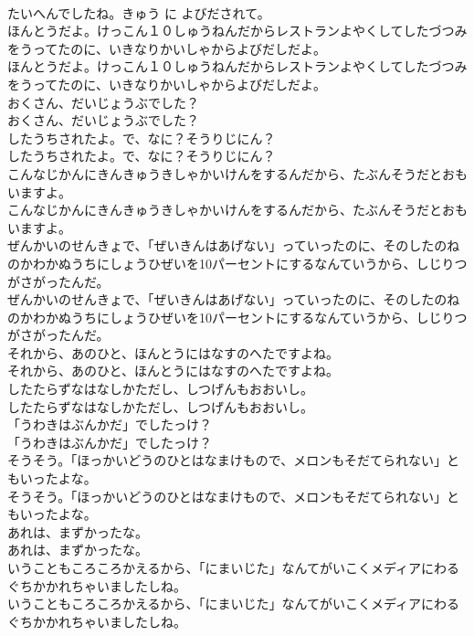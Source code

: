 \documentclass[8pt]{extreport}
\begin{document}
\begin{CJK}{UTF8}{min}
\\	たいへんでしたね。きゅう に よびだされて。
\\	ほんとうだよ。けっこん１０しゅうねんだからレストランよやくしてしたづつみをうってたのに、いきなりかいしゃからよびだしだよ。
\\	ほんとうだよ。けっこん１０しゅうねんだからレストランよやくしてしたづつみをうってたのに、いきなりかいしゃからよびだしだよ。
\\	おくさん、だいじょうぶでした？
\\	おくさん、だいじょうぶでした？
\\	したうちされたよ。で、なに？そうりじにん？
\\	したうちされたよ。で、なに？そうりじにん？
\\	こんなじかんにきんきゅうきしゃかいけんをするんだから、たぶんそうだとおもいますよ。
\\	こんなじかんにきんきゅうきしゃかいけんをするんだから、たぶんそうだとおもいますよ。
\\	ぜんかいのせんきょで、「ぜいきんはあげない」っていったのに、そのしたのねのかわかぬうちにしょうひぜいを10パーセントにするなんていうから、しじりつがさがったんだ。
\\	ぜんかいのせんきょで、「ぜいきんはあげない」っていったのに、そのしたのねのかわかぬうちにしょうひぜいを10パーセントにするなんていうから、しじりつがさがったんだ。
\\	それから、あのひと、ほんとうにはなすのへたですよね。
\\	それから、あのひと、ほんとうにはなすのへたですよね。
\\	したたらずなはなしかただし、しつげんもおおいし。
\\	したたらずなはなしかただし、しつげんもおおいし。
\\	「うわきはぶんかだ」でしたっけ？
\\	「うわきはぶんかだ」でしたっけ？
\\	そうそう。「ほっかいどうのひとはなまけもので、メロンもそだてられない」ともいったよな。
\\	そうそう。「ほっかいどうのひとはなまけもので、メロンもそだてられない」ともいったよな。
\\	あれは、まずかったな。
\\	あれは、まずかったな。
\\	いうこともころころかえるから、「にまいじた」なんてがいこくメディアにわるぐちかかれちゃいましたしね。
\\	いうこともころころかえるから、「にまいじた」なんてがいこくメディアにわるぐちかかれちゃいましたしね。

\end{CJK}
\end{document}
